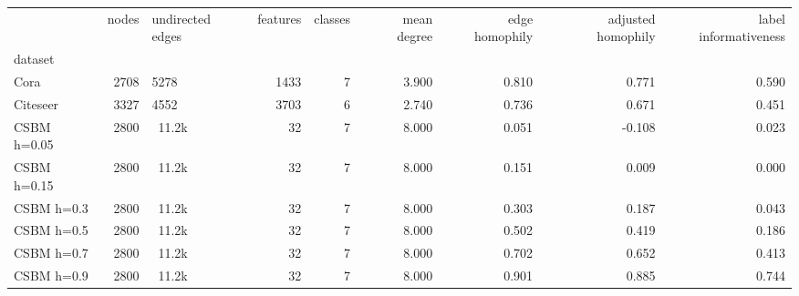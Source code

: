 \begin{tabular}{lrlrrrrrr}
\toprule
 & nodes & undirected edges & features & classes & mean degree & edge homophily & adjusted homophily & label informativeness \\
dataset &  &  &  &  &  &  &  &  \\
\midrule
Cora & 2708 & 5278 & 1433 & 7 & 3.900 & 0.810 & 0.771 & 0.590 \\
Citeseer & 3327 & 4552 & 3703 & 6 & 2.740 & 0.736 & 0.671 & 0.451 \\
CSBM h=0.05 & 2800 & ~11.2k & 32 & 7 & 8.000 & 0.051 & -0.108 & 0.023 \\
CSBM h=0.15 & 2800 & ~11.2k & 32 & 7 & 8.000 & 0.151 & 0.009 & 0.000 \\
CSBM h=0.3 & 2800 & ~11.2k & 32 & 7 & 8.000 & 0.303 & 0.187 & 0.043 \\
CSBM h=0.5 & 2800 & ~11.2k & 32 & 7 & 8.000 & 0.502 & 0.419 & 0.186 \\
CSBM h=0.7 & 2800 & ~11.2k & 32 & 7 & 8.000 & 0.702 & 0.652 & 0.413 \\
CSBM h=0.9 & 2800 & ~11.2k & 32 & 7 & 8.000 & 0.901 & 0.885 & 0.744 \\
\bottomrule
\end{tabular}
